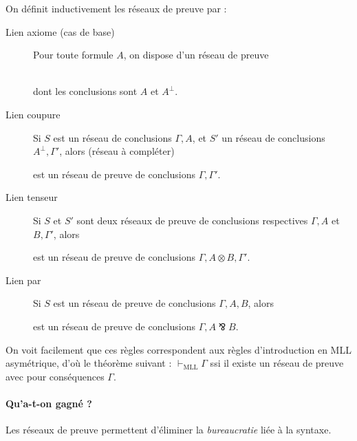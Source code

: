 \documentclass[a4paper, 11pt]{article}
\newcommand{\parr}{\mathbin{⅋}}
\begin{document}
On définit inductivement les réseaux de preuve par :
\begin{description}
\item[Lien axiome (cas de base)] Pour toute formule $A$, on dispose d'un réseau de preuve
   \\
dont les conclusions sont $A$ et $A^\perp$.
\item[Lien coupure] Si $S$ est un réseau de conclusions $\Gamma, A$, et $S'$ un réseau de conclusions $A^\perp, \Gamma'$, alors (réseau à compléter)
  \begin{center}
  \end{center}
  est un réseau de preuve de conclusions $\Gamma, \Gamma'$.
\item[Lien tenseur] Si $S$ et $S'$ sont deux réseaux de preuve de conclusions respectives $\Gamma, A$ et $B, \Gamma'$, alors
  \begin{center}
    \begin{tikzpicture}
    \end{tikzpicture}
  \end{center}
  est un réseau de preuve de conclusions $\Gamma, A \otimes B, \Gamma'$.
\item[Lien par] Si $S$ est un réseau de preuve de conclusions $\Gamma, A, B$, alors
  \begin{center}
    \begin{tikzpicture}
    \end{tikzpicture}
  \end{center}
est un réseau de preuve de conclusions $\Gamma, A \parr B$.
\end{description}
On voit facilement que ces règles correspondent aux règles d'introduction en MLL asymétrique, d'où le théorème suivant : $\vdash_{\mathrm{MLL}} \Gamma$ ssi il existe un réseau de preuve avec pour conséquences $\Gamma$.

\paragraph{Qu'a-t-on gagné ?} Les réseaux de preuve permettent d'éliminer la \emph{bureaucratie} liée à la syntaxe.
\end{document}
